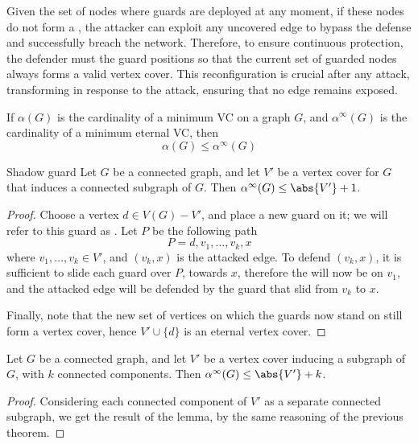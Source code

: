 \documentclass[a4paper, 12pt]{report}
\begin{document}
    Given the set of nodes where guards are deployed at any moment, if these nodes do not form a , the attacker can exploit any uncovered edge to bypass the defense and successfully breach the network. Therefore, to ensure continuous protection, the defender must  the guard positions so that the current set of guarded nodes always forms a valid vertex cover. This reconfiguration is crucial after any attack, transforming  in response to the attack, ensuring that no edge remains exposed.

    If $\alpha (G)$ is the cardinality of a minimum VC on a graph $G$, and $\alpha ^{\infty}(G)$ is the cardinality of a minimum eternal VC, then $$\alpha(G) \le \alpha^{\infty}(G)$$

    \begin{framedthm}{Shadow guard}
        Let $G$ be a connected graph, and let $V'$ be a vertex cover for $G$ that induces a connected subgraph of $G$. Then $\alpha^{\infty}(G) \le \abs{V'} + 1$.
    \end{framedthm}

    \begin{proof}
        Choose a vertex $d \in V(G) - V'$, and place a new guard on it; we will refer to this guard as . Let $P$ be the following path $$P = d, v_1, \ldots, v_k, x$$ where $v_1, \ldots, v_k \in V'$, and $(v_k, x)$ is the attacked edge. To defend $(v_k, x)$, it is sufficient to slide each guard over $P$, towards $x$, therefore the  will now be on $v_1$, and the attacked edge will be defended by the guard that slid from $v_k$ to $x$.

        Finally, note that the new set of vertices on which the guards now stand on still form a vertex cover, hence $V' \cup \{d\}$ is an eternal vertex cover.
    \end{proof}

    \begin{framedlem}{}
        Let $G$ be a connected graph, and let $V'$ be a vertex cover inducing a subgraph of $G$, with $k$ connected components. Then $\alpha^{\infty}(G) \le \abs{V'} + k$.
    \end{framedlem}

    \begin{proof}
        Considering each connected component of $V'$ as a separate connected subgraph, we get the result of the lemma, by the same reasoning of the previous theorem.
    \end{proof}
\end{document}
